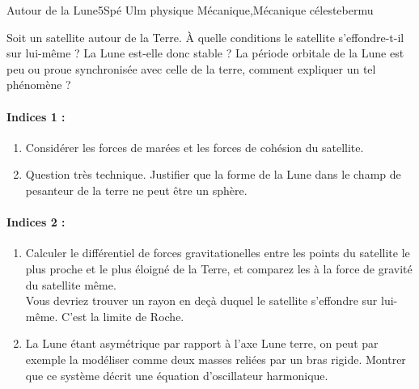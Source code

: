 
\begin{exercise}{Autour de la Lune}{5}{Spé Ulm physique}
{Mécanique,Mécanique céleste}{bermu}

\begin{questions}
\question Soit un satellite autour de la Terre. \`A quelle conditions le satellite s’effondre-t-il sur lui-même ? La Lune est-elle donc stable ?
\question La période orbitale de la Lune est peu ou proue synchronisée avec celle de la terre, comment expliquer un tel phénomène ?
\end{questions}

\paragraph{Indices 1 : }
\begin{enumerate}
    \item Considérer les forces de marées et les forces de cohésion du satellite.
    \item Question très technique. Justifier que la forme de la Lune dans le champ de pesanteur de la terre ne peut être un sphère.
\end{enumerate}

\paragraph{Indices 2 : }
\begin{enumerate}
    \item Calculer le différentiel de forces gravitationelles entre les points du satellite le plus proche et le plus éloigné de la Terre, et comparez les à la force de gravité du satellite même. \\
Vous devriez trouver un rayon en deçà duquel le satellite s'effondre sur lui-même. C'est la limite de Roche.
    \item La Lune étant asymétrique par rapport à l'axe Lune terre, on peut par exemple la modéliser comme deux masses reliées par un bras rigide. Montrer que ce système décrit une équation d'oscillateur harmonique.
\end{enumerate}
\end{exercise}